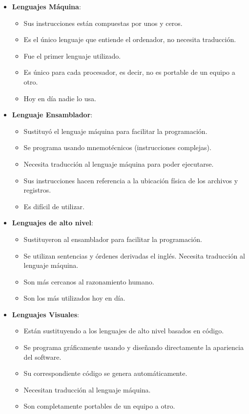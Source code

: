 \begin{itemize}
    \item \textbf{Lenguajes Máquina}:
    \begin{itemize}
        \item Sus instrucciones están compuestas por unos y ceros.
        \item Es el único lenguaje que entiende el ordenador, no necesita traducción.
        \item Fue el primer lenguaje utilizado.
        \item Es único para cada procesador, es decir, no es portable de un equipo a otro.
        \item Hoy en día nadie lo usa.
    \end{itemize}
    \item \textbf{Lenguaje Ensamblador}:
    \begin{itemize}
        \item Sustituyó el lenguaje máquina para facilitar la programación.
        \item Se programa usando mnemotécnicos (instrucciones complejas).
        \item Necesita traducción al lenguaje máquina para poder ejecutarse.
        \item Sus instrucciones hacen referencia a la ubicación física de los archivos y registros.
        \item Es difícil de utilizar.
    \end{itemize}
    \item \textbf{Lenguajes de alto nivel}:
    \begin{itemize}
        \item Sustituyeron al ensamblador para facilitar la programación.
        \item Se utilizan sentencias y órdenes derivadas el inglés. Necesita traducción al lenguaje máquina.
        \item Son más cercanos al razonamiento humano.
        \item Son los más utilizados hoy en día.
    \end{itemize}
    \item \textbf{Lenguajes Visuales}:
    \begin{itemize}
        \item Están sustituyendo a los lenguajes de alto nivel basados en código.
        \item Se programa gráficamente usando y diseñando directamente la apariencia del software.
        \item Su correspondiente código se genera automáticamente.
        \item Necesitan traducción al lenguaje máquina.
        \item Son completamente portables de un equipo a otro.
    \end{itemize}
\end{itemize}

